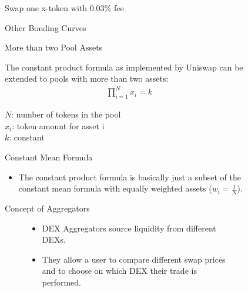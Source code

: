 \documentclass[]{beamer}
\begin{document}
\begin{minipage}{0.5\textwidth}
\begin{figure}[h!]
\begin{frame}{Swap one x-token with 0.03\% fee}
\begin{frame}{Other Bonding Curves}
\begin{frame}{More than two Pool Assets}

The constant product formula as implemented by Uniswap can be extended to pools with more than two assets:
		\begin{align*}
			\prod_{i=1}^N x_i= k
		\end{align*}
		
$N$: number of tokens in the pool\\
$x_i$: token amount for asset i\\
$k$: constant

\end{frame}


\begin{frame}{Constant Mean Formula}
\begin{itemize}
		\begin{align*}
			\prod_{i=1}^N x_i^{w_i}= k
		\end{align*}

		$N$: number of tokens in the pool\\
		$x_i$: token amount for asset i\\
		$w_i$: weight of asset $i$\\
		$k$: constant
		\vspace{0.5cm}
	\item The constant product formula is basically just a subset of the constant mean formula with equally weighted assets ($w_i = \tfrac{1}{N}$).
\end{itemize}

\end{frame}


\begin{frame}{Concept of Aggregators}

\begin{figure}[t]
	\centering	
\begin{figure}
	\centering
	\resizebox{0.8\textwidth}{!}{
	\begin{tikzpicture}[scale=1.0, every node/.style={scale=1.0}]
			
	\end{tikzpicture}}
\end{figure}
	
\begin{itemize}
	\item DEX Aggregators source liquidity from different DEXs.
	\item They allow a user to compare different swap prices and to choose on which DEX their trade is performed.
\end{itemize}


\end{figure}
\end{frame}
\end{frame}
\end{frame}
\end{figure}
\end{minipage}
\end{document}
